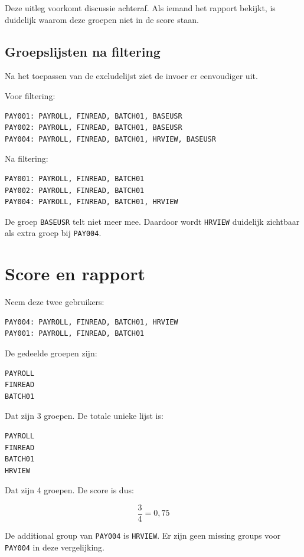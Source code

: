 Deze uitleg voorkomt discussie achteraf. Als iemand het rapport bekijkt, is duidelijk waarom deze groepen niet in de score staan.

\subsection*{Groepslijsten na filtering}

Na het toepassen van de excludelijst ziet de invoer er eenvoudiger uit.

Voor filtering:

\begin{verbatim}
PAY001: PAYROLL, FINREAD, BATCH01, BASEUSR
PAY002: PAYROLL, FINREAD, BATCH01, BASEUSR
PAY004: PAYROLL, FINREAD, BATCH01, HRVIEW, BASEUSR
\end{verbatim}

Na filtering:

\begin{verbatim}
PAY001: PAYROLL, FINREAD, BATCH01
PAY002: PAYROLL, FINREAD, BATCH01
PAY004: PAYROLL, FINREAD, BATCH01, HRVIEW
\end{verbatim}

De groep \texttt{BASEUSR} telt niet meer mee. Daardoor wordt \texttt{HRVIEW} duidelijk zichtbaar als extra groep bij \texttt{PAY004}.

\section{Score en rapport}

Neem deze twee gebruikers:

\begin{verbatim}
PAY004: PAYROLL, FINREAD, BATCH01, HRVIEW
PAY001: PAYROLL, FINREAD, BATCH01
\end{verbatim}

De gedeelde groepen zijn:

\begin{verbatim}
PAYROLL
FINREAD
BATCH01
\end{verbatim}

Dat zijn 3 groepen. De totale unieke lijst is:

\begin{verbatim}
PAYROLL
FINREAD
BATCH01
HRVIEW
\end{verbatim}

Dat zijn 4 groepen. De score is dus:

\[
\frac{3}{4} = 0,75
\]

De additional group van \texttt{PAY004} is \texttt{HRVIEW}. Er zijn geen missing groups voor \texttt{PAY004} in deze vergelijking.

